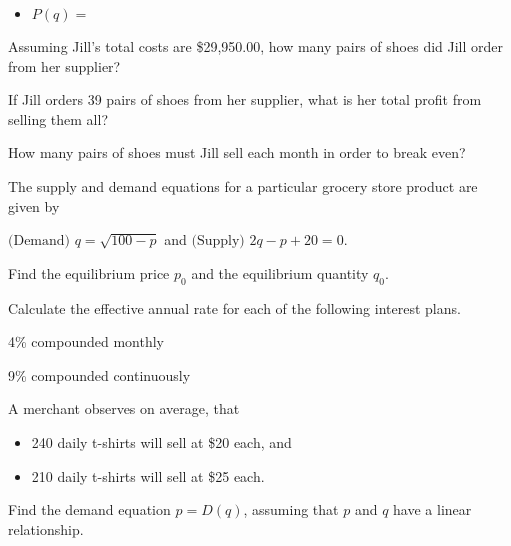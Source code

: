 \documentclass[12pt,legalpaper]{exam}
\newcommand{\vsp}{\vspace{0.5cm}}
\newcommand{\smsp}{\vspace{0.25cm}}
\begin{document}
\begin{questions}
\begin{compactenum}[(a)]
\begin{itemize}
\item[] $P(q) =$
\end{itemize}
\vspace{1.5cm} 

\smsp

\item Assuming Jill's total costs are \$29,950.00, how many pairs of shoes did Jill order from her supplier?
\vfill

\item If Jill orders 39 pairs of shoes from her supplier, what is her total profit from selling them all?
\vfill

\item How many pairs of shoes must Jill sell each month in order to break even?
\vfill
\end{compactenum}
\newpage

\question[4] The supply and demand equations for a particular grocery store product are given by
\begin{center}
$\text{(Demand) }q = \sqrt{100 - p}$ and $\text{(Supply) }2q - p + 20 = 0$.
\end{center}
Find the equilibrium price $p_{0}$ and the equilibrium quantity $q_{0}$.
\vspace{15cm}

\question[3] Calculate the effective annual rate for each of the following interest plans.
\begin{compactenum}[(a)]
\item 4\% compounded monthly
\vspace{5cm}

\item 9\% compounded continuously
\vspace{5cm}
\end{compactenum}
\newpage

\question[5] A merchant observes on average, that
\begin{itemize}
\item 240 daily t-shirts will sell at \$20 each, and
\smsp

\item 210 daily t-shirts will sell at \$25 each.
\end{itemize}
\vsp

\begin{compactenum}[(a)]
\item Find the demand equation $p = D(q)$, assuming that $p$ and $q$ have a linear relationship.
\vspace{5cm}


\end{compactenum}
\end{questions}
\end{document}

